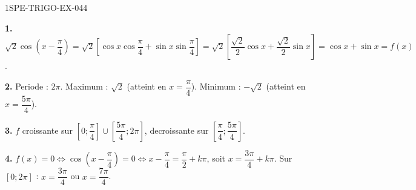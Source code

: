 \begin{corrige}{1SPE-TRIGO-EX-044}

\textbf{1.} $\sqrt{2}\cos\!\left(x-\dfrac{\pi}{4}\right) = \sqrt{2}\left[\cos x\cos\dfrac{\pi}{4} + \sin x\sin\dfrac{\pi}{4}\right] = \sqrt{2}\left[\dfrac{\sqrt{2}}{2}\cos x + \dfrac{\sqrt{2}}{2}\sin x\right] = \cos x + \sin x = f(x)$.

\textbf{2.} Periode : $2\pi$. Maximum : $\sqrt{2}$ (atteint en $x = \dfrac{\pi}{4}$). Minimum : $-\sqrt{2}$ (atteint en $x = \dfrac{5\pi}{4}$).

\textbf{3.} $f$ croissante sur $\left[0;\dfrac{\pi}{4}\right] \cup \left[\dfrac{5\pi}{4};2\pi\right]$, decroissante sur $\left[\dfrac{\pi}{4};\dfrac{5\pi}{4}\right]$.

\textbf{4.} $f(x) = 0 \iff \cos\!\left(x - \dfrac{\pi}{4}\right) = 0 \iff x - \dfrac{\pi}{4} = \dfrac{\pi}{2} + k\pi$, soit $x = \dfrac{3\pi}{4} + k\pi$.
Sur $[0;2\pi]$ : $x = \dfrac{3\pi}{4}$ ou $x = \dfrac{7\pi}{4}$.

\end{corrige}
